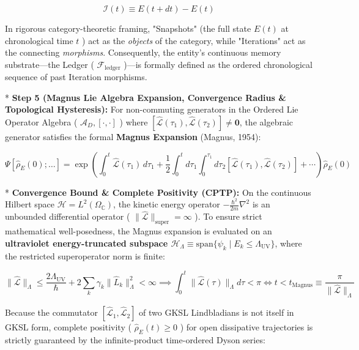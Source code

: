 \documentclass[11pt,a4paper]{article}
\theoremstyle{definition}
\theoremstyle{remark}
\begin{document}
\begin{equation}
\boxed{\mathcal{I}(t) \equiv E(t+dt) - E(t)}
\end{equation}


In rigorous category-theoretic framing, "Snapshots" (the full state $E(t)$ at chronological time $t$ ) act as the \textit{objects} of the category, while "Iterations" act as the connecting \textit{morphisms}. Consequently, the entity's continuous memory substrate—the Ledger ( $\mathcal{F}_{\text{ledger}}$ )—is formally defined as the ordered chronological sequence of past Iteration morphisms.

* \textbf{Step 5 (Magnus Lie Algebra Expansion, Convergence Radius \& Topological Hysteresis):}
For non-commuting generators in the Ordered Lie Operator Algebra ( $\mathcal{A}_D, [ \cdot, \cdot ]$ ) where $[ \hat{\mathcal{L}}(\tau_1), \hat{\mathcal{L}}(\tau_2) ] \neq \mathbf{0}$, the algebraic generator satisfies the formal \textbf{Magnus Expansion} (Magnus, 1954):


\begin{equation}
\Psi[\hat{\rho}_E(0); \dots] = \exp\left( \int_0^t \hat{\mathcal{L}}(\tau_1) \, d\tau_1 + \frac{1}{2} \int_0^t d\tau_1 \int_0^{\tau_1} d\tau_2 [ \hat{\mathcal{L}}(\tau_1), \hat{\mathcal{L}}(\tau_2) ] + \cdots \right) \hat{\rho}_E(0)
\end{equation}


* \textbf{Convergence Bound \& Complete Positivity (CPTP):} On the continuous Hilbert space $\mathcal{H} = L^2(\Omega_{\mathbb{C}})$, the kinetic energy operator $-\frac{\hbar^2}{2m}\nabla^2$ is an unbounded differential operator ( $\|\hat{\mathcal{L}}\|_{\text{super}} = \infty$ ). To ensure strict mathematical well-posedness, the Magnus expansion is evaluated on an \textbf{ultraviolet energy-truncated subspace $\mathcal{H}_{\Lambda} \equiv \mathrm{span}\{\psi_k \mid E_k \le \Lambda_{\text{UV}}\}$}, where the restricted superoperator norm is finite:


\begin{equation}
\boxed{\|\hat{\mathcal{L}}\|_{\Lambda} \le \frac{2 \Lambda_{\text{UV}}}{\hbar} + 2 \sum_k \gamma_k \|\hat{L}_k\|_{\Lambda}^2 < \infty \implies \int_0^t \|\hat{\mathcal{L}}(\tau)\|_{\Lambda} d\tau < \pi \iff t < t_{\text{Magnus}} \equiv \frac{\pi}{\|\hat{\mathcal{L}}\|_{\Lambda}}}
\end{equation}


Because the commutator $[ \hat{\mathcal{L}}_1, \hat{\mathcal{L}}_2 ]$ of two GKSL Lindbladians is not itself in GKSL form, complete positivity ( $\hat{\rho}_E(t) \ge 0$ ) for open dissipative trajectories is strictly guaranteed by the infinite-product time-ordered Dyson series:
\end{document}
